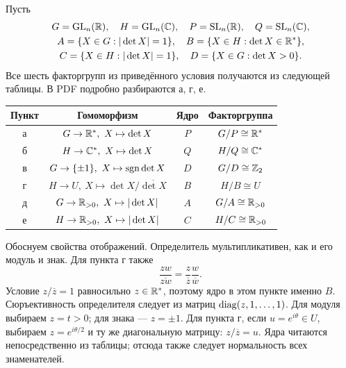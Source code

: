 Пусть
\[
\begin{gathered}
G=\operatorname{GL}_n(\mathbb{R}),\quad H=\operatorname{GL}_n(\mathbb{C}),\quad
P=\operatorname{SL}_n(\mathbb{R}),\quad Q=\operatorname{SL}_n(\mathbb{C}),\\
A=\{X\in G:|\det X|=1\},\quad
B=\{X\in H:\det X\in\mathbb{R}^*\},\\
C=\{X\in H:|\det X|=1\},\quad
D=\{X\in G:\det X>0\}.
\end{gathered}
\]
Все шесть факторгрупп из приведённого условия получаются
из следующей таблицы. В PDF подробно разбираются а, г, е.
\begin{center}
\begin{tabular}{c|c|c|c}
Пункт & Гомоморфизм & Ядро & Факторгруппа\\\hline
а & $G\to\R^*,\ X\mapsto\det X$ & $P$ & $G/P\cong\mathbb{R}^*$\\
б & $H\to\C^*,\ X\mapsto\det X$ & $Q$ & $H/Q\cong\mathbb{C}^*$\\
в & $G\to\{\pm1\},\ X\mapsto\operatorname{sgn}\det X$ & $D$ & $G/D\cong\mathbb{Z}_2$\\
г & $H\to U,\ X\mapsto\det X/\overline{\det X}$ & $B$ & $H/B\cong U$\\
д & $G\to\Rp,\ X\mapsto|\det X|$ & $A$ & $G/A\cong\mathbb{R}_{>0}$\\
е & $H\to\Rp,\ X\mapsto|\det X|$ & $C$ & $H/C\cong\mathbb{R}_{>0}$
\end{tabular}
\end{center}
Обоснуем свойства отображений. Определитель мультипликативен,
как и его модуль и знак. Для пункта г также
\[\frac{zw}{\overline{zw}}=
 \frac z{\overline z}\frac w{\overline w}.
\]
Условие $z/\overline z=1$ равносильно $z\in\mathbb{R}^*$,
поэтому ядро в этом пункте именно $B$.
Сюръективность определителя следует из матриц
$\operatorname{diag}(z,1,\dots,1)$. Для модуля выбираем $z=t>0$;
для знака --- $z=\pm1$.
Для пункта г, если $u=e^{i\theta}\in U$, выбираем
$z=e^{i\theta/2}$ и ту же диагональную матрицу:
$z/\overline z=u$.
Ядра читаются непосредственно из таблицы; отсюда также
следует нормальность всех знаменателей.

